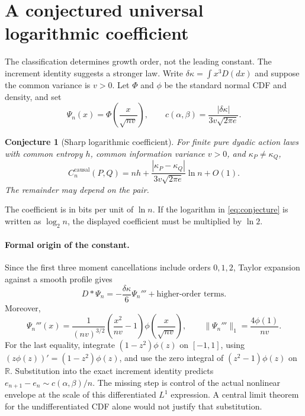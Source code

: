 \documentclass[11pt,a4paper]{article}
\newtheorem{conjecture}[theorem]{Conjecture}
\numberwithin{equation}{section}
\begin{document}
\section{A conjectured universal logarithmic coefficient}\label{sec:coefficient}
The classification determines growth order, not the leading constant.
The increment identity suggests a stronger law. Write
$\delta\kappa=\int x^3D(dx)$ and suppose the common variance is $v>0$.
Let $\Phi$ and $\phi$ be the standard normal CDF and density, and set
\[
\Psi_n(x)=\Phi\!\left(\frac{x}{\sqrt{nv}}\right),\qquad
c(\alpha,\beta)=\frac{|\delta\kappa|}{3v\sqrt{2\pi e}}.
\]
\begin{conjecture}[Sharp logarithmic coefficient]\label{conj:sharp}
For finite pure dyadic action laws with common entropy $h$, common
information variance $v>0$, and $\kappa_P\ne\kappa_Q$,
\begin{equation}\label{eq:conjecture}
C_n^{\mathrm{causal}}(P,Q)
=nh+\frac{|\kappa_P-\kappa_Q|}{3v\sqrt{2\pi e}}\ln n+O(1).
\end{equation}
The remainder may depend on the pair.
\end{conjecture}
The coefficient is in bits per unit of $\ln n$. If the logarithm in
\eqref{eq:conjecture} is written as $\log_2 n$, the displayed coefficient
must be multiplied by $\ln 2$.

\paragraph{Formal origin of the constant.}
Since the first three moment cancellations include orders $0,1,2$,
Taylor expansion against a smooth profile gives
\[
D*\Psi_n=-\frac{\delta\kappa}{6}\Psi_n'''
             +\text{higher-order terms}.
\]
Moreover,
\[
\Psi_n'''(x)=\frac{1}{(nv)^{3/2}}
 \left(\frac{x^2}{nv}-1\right)\phi\!\left(\frac{x}{\sqrt{nv}}\right),
\qquad
\|\Psi_n'''\|_1=\frac{4\phi(1)}{nv}.
\]
For the last equality, integrate $(1-z^2)\phi(z)$ on $[-1,1]$,
using $(z\phi(z))'=(1-z^2)\phi(z)$, and use the zero integral of
$(z^2-1)\phi(z)$ on $\mathbb R$. Substitution into the exact increment
identity predicts $e_{n+1}-e_n\sim c(\alpha,\beta)/n$.
The missing step is control of the actual nonlinear envelope at the
scale of this differentiated $L^1$ expression. A central limit theorem
for the undifferentiated CDF alone would not justify that substitution.
\end{document}
